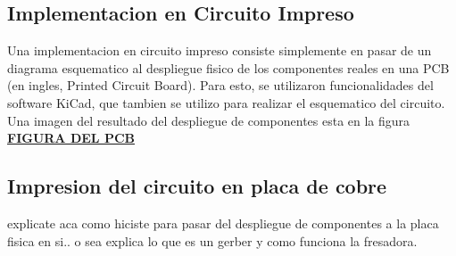 
\subsection{Implementacion en Circuito Impreso} %
\label{sub:implementacion_en_circuito_impreso}

Una implementacion en circuito impreso consiste simplemente en pasar de un diagrama esquematico al despliegue fisico de los componentes reales en una PCB (en ingles, Printed Circuit Board). Para esto, se utilizaron funcionalidades del software KiCad, que tambien se utilizo para realizar el esquematico del circuito. Una imagen del resultado del despliegue de componentes esta en la figura \textbf{\underline{FIGURA DEL PCB}}


\subsection{Impresion del circuito en placa de cobre} %
\label{sub:impresion_del_circuito_en_placa_de_cobre}

explicate aca como hiciste para pasar del despliegue de componentes a la placa fisica en si.. o sea explica lo que es un gerber y como funciona la fresadora.


